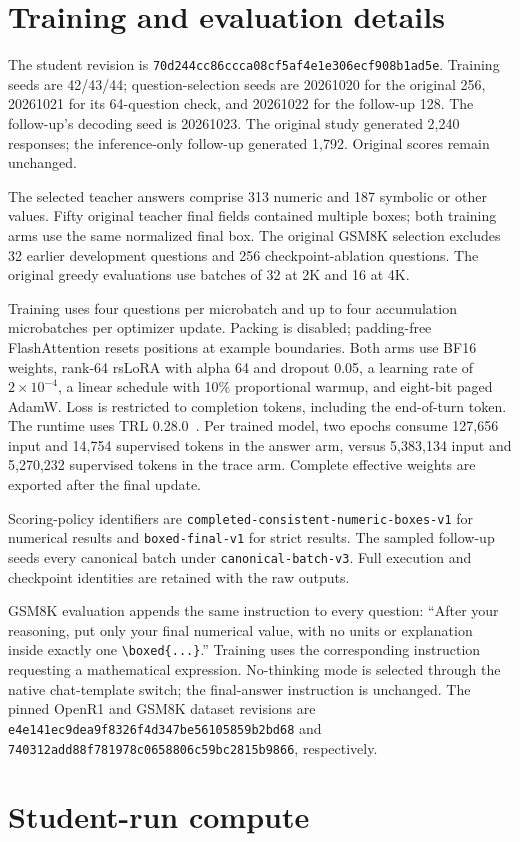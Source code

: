 \documentclass[11pt]{article}
\begin{document}
\section{Training and evaluation details}
\label{app:details}
The student revision is \texttt{70d244cc86ccca08cf5af4e1e306ecf908b1ad5e}. Training seeds are 42/43/44; question-selection seeds are 20261020 for the original 256, 20261021 for its 64-question check, and 20261022 for the follow-up 128. The follow-up's decoding seed is 20261023. The original study generated 2,240 responses; the inference-only follow-up generated 1,792. Original scores remain unchanged.

The selected teacher answers comprise 313 numeric and 187 symbolic or other values. Fifty original teacher final fields contained multiple boxes; both training arms use the same normalized final box. The original GSM8K selection excludes 32 earlier development questions and 256 checkpoint-ablation questions. The original greedy evaluations use batches of 32 at 2K and 16 at 4K.

Training uses four questions per microbatch and up to four accumulation microbatches per optimizer update. Packing is disabled; padding-free FlashAttention resets positions at example boundaries. Both arms use BF16 weights, rank-64 rsLoRA with alpha 64 and dropout 0.05, a learning rate of $2\times10^{-4}$, a linear schedule with 10\% proportional warmup, and eight-bit paged AdamW. Loss is restricted to completion tokens, including the end-of-turn token. The runtime uses TRL 0.28.0~\cite{trl}. Per trained model, two epochs consume 127,656 input and 14,754 supervised tokens in the answer arm, versus 5,383,134 input and 5,270,232 supervised tokens in the trace arm. Complete effective weights are exported after the final update.

Scoring-policy identifiers are \texttt{completed-consistent-numeric-boxes-v1} for numerical results and \texttt{boxed-final-v1} for strict results. The sampled follow-up seeds every canonical batch under \texttt{canonical-batch-v3}. Full execution and checkpoint identities are retained with the raw outputs.

GSM8K evaluation appends the same instruction to every question: ``After your reasoning, put only your final numerical value, with no units or explanation inside exactly one \texttt{\textbackslash boxed\{...\}}.'' Training uses the corresponding instruction requesting a mathematical expression. No-thinking mode is selected through the native chat-template switch; the final-answer instruction is unchanged. The pinned OpenR1 and GSM8K dataset revisions are \texttt{e4e141ec9dea9f8326f4d347be56105859b2bd68} and \texttt{740312add88f781978c0658806c59bc2815b9866}, respectively.

\section{Student-run compute}

\end{document}
